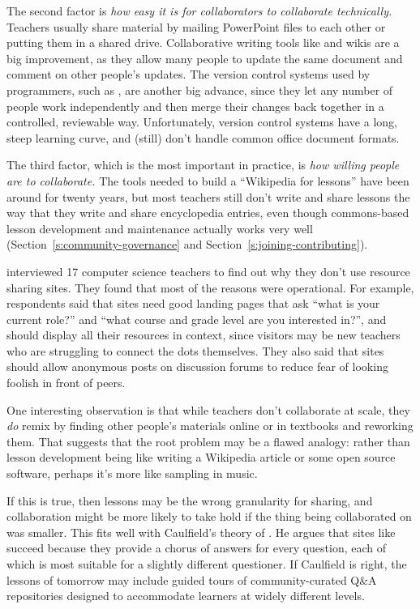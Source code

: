 The second factor is \emph{how easy it is for collaborators to collaborate
technically.} Teachers usually share material by mailing PowerPoint
files to each other or putting them in a shared drive. Collaborative
writing tools like  and wikis are
a big improvement, as they allow many people to update the same
document and comment on other people's updates. The version control
systems used by programmers, such as , are
another big advance, since they let any number of people work
independently and then merge their changes back together in a
controlled, reviewable way. Unfortunately, version control systems
have a long, steep learning curve, and (still) don't handle common
office document formats.

The third factor, which is the most important in practice, is \emph{how
willing people are to collaborate.} The tools needed to build a
``Wikipedia for lessons'' have been around for twenty years, but most
teachers still don't write and share lessons the way that they write
and share encyclopedia entries, even though commons-based lesson
development and maintenance actually works very well
(Section~\ref{s:community-governance} and
Section~\ref{s:joining-contributing}).

\cite{Leak2017} interviewed 17 computer science teachers to find
out why they don't use resource sharing sites. They found that most of
the reasons were operational. For example, respondents said that sites
need good landing pages that ask ``what is your current role?'' and
``what course and grade level are you interested in?'', and should
display all their resources in context, since visitors may be new
teachers who are struggling to connect the dots themselves. They also
said that sites should allow anonymous posts on discussion forums to
reduce fear of looking foolish in front of peers.

One interesting observation is that while teachers don't collaborate
at scale, they \emph{do} remix by finding other people's materials online
or in textbooks and reworking them. That suggests that the root
problem may be a flawed analogy: rather than lesson development being
like writing a Wikipedia article or some open source software, perhaps
it's more like sampling in music.

If this is true, then lessons may be the wrong granularity for
sharing, and collaboration might be more likely to take hold if the
thing being collaborated on was smaller. This fits well with
Caulfield's theory of . He
argues that sites like  succeed
because they provide a chorus of answers for every question, each of
which is most suitable for a slightly different questioner. If
Caulfield is right, the lessons of tomorrow may include guided tours
of community-curated Q\&A repositories designed to accommodate learners
at widely different levels.

